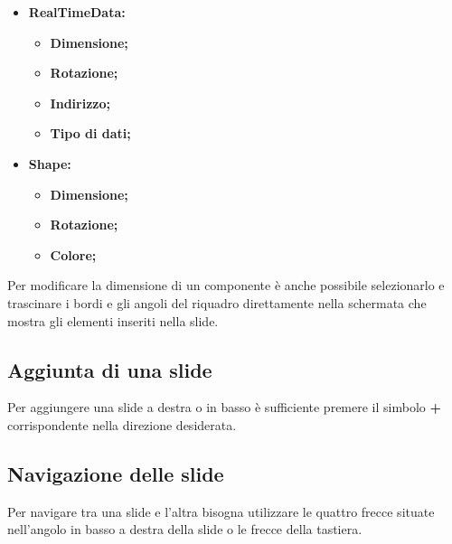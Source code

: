 \begin{itemize}
	\item \textbf{RealTimeData:}
		\begin{itemize}
			\item \textbf{Dimensione;}
			\item \textbf{Rotazione;}
			\item \textbf{Indirizzo;}
			\item \textbf{Tipo di dati;}
		\end{itemize}
		
	\item \textbf{Shape:}
		\begin{itemize}
			\item \textbf{Dimensione;}
			\item \textbf{Rotazione;}
			\item \textbf{Colore;}
		\end{itemize}
\end{itemize}

\noindent Per modificare la dimensione di un componente è anche possibile selezionarlo e trascinare i bordi e gli angoli del riquadro direttamente nella schermata che mostra gli elementi inseriti nella slide.

\subsection{Aggiunta di una slide}
Per aggiungere una slide a destra o in basso è sufficiente premere il simbolo \textbf{+} corrispondente nella direzione desiderata.

\subsection{Navigazione delle slide}
Per navigare tra una slide e l'altra bisogna utilizzare le quattro frecce situate nell'angolo in basso a destra della slide o le frecce della tastiera.